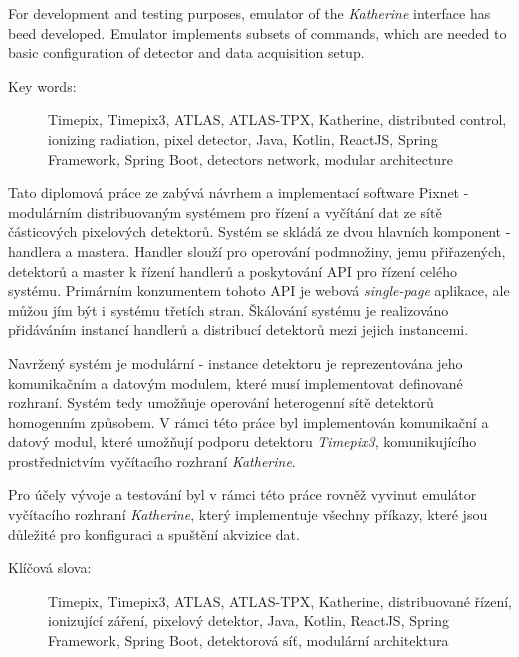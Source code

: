 \documentclass[11pt,twoside,a4paper]{book}
\begin{document}
	For development and testing purposes, emulator of the \textit{Katherine} interface has beed developed. Emulator implements subsets of commands, which are needed to basic configuration of detector and data acquisition setup.

	\vspace*{2cm}
	\begin{description}
		\item[Key words:] Timepix, Timepix3, ATLAS, ATLAS-TPX, Katherine, distributed control, ionizing radiation, pixel detector, Java, Kotlin, ReactJS, Spring Framework, Spring Boot, detectors network, modular architecture
	\end{description}

	\abstractpagecz
	Tato diplomová práce ze zabývá návrhem a implementací software Pixnet - modulárním distribuovaným systémem pro řízení a vyčítání dat ze sítě částicových pixelových detektorů. Systém se skládá ze dvou hlavních komponent - handlera a mastera. Handler slouží pro operování podmnožiny, jemu přiřazených, detektorů a master k řízení handlerů a poskytování API pro řízení celého systému. Primárním konzumentem tohoto API je webová \textit{single-page} aplikace, ale můžou jím být i systému třetích stran. Škálování systému je realizováno přidáváním instancí handlerů a distribucí detektorů mezi jejich instancemi.
	
	Navržený systém je modulární - instance detektoru je reprezentována jeho komunikačním a datovým modulem, které musí implementovat definované rozhraní. Systém tedy umožňuje operování heterogenní sítě detektorů homogenním způsobem. V rámci této práce byl implementován komunikační a datový modul, které umožňují podporu detektoru \textit{Timepix3}, komunikujícího prostřednictvím vyčítacího rozhraní \textit{Katherine}.

	Pro účely vývoje a testování byl v rámci této práce rovněž vyvinut emulátor vyčítacího rozhraní \textit{Katherine}, který implementuje všechny příkazy, které jsou důležité pro konfiguraci a spuštění akvizice dat.

	\vspace*{2cm}
	\begin{description}
		\item[Klíčová slova:] Timepix, Timepix3, ATLAS, ATLAS-TPX, Katherine, distribuované řízení, ionizující záření, pixelový detektor, Java, Kotlin, ReactJS, Spring Framework, Spring Boot, detektorová síť, modulární architektura
	\end{description}
\end{document}
